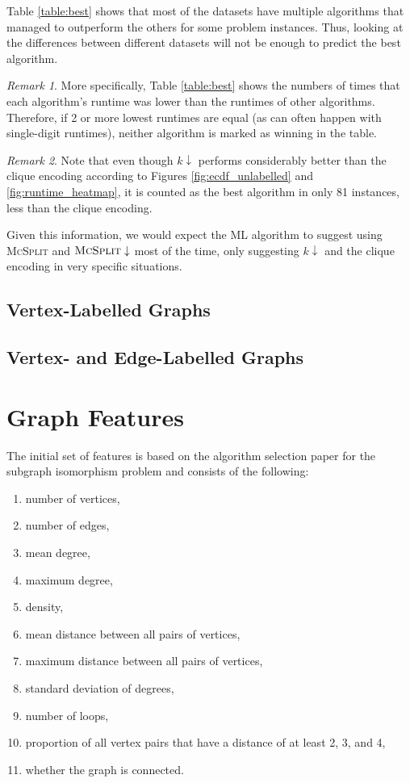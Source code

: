 \documentclass{l4proj}
\theoremstyle{definition}
\theoremstyle{remark}
\newtheorem{remark}{Remark}[section]
\begin{document}
Table \ref{table:best} shows that most of the datasets have multiple algorithms
that managed to outperform the others for some problem instances. Thus, looking
at the differences between different datasets will not be enough to predict the
best algorithm.

\begin{remark}
  More specifically, Table \ref{table:best} shows the numbers of times that each
  algorithm's runtime was lower than the runtimes of other algorithms.
  Therefore, if 2 or more lowest runtimes are equal (as can often happen with
  single-digit runtimes), neither algorithm is marked as winning in the table.
\end{remark}

\begin{remark}
Note that even though $k\downarrow$ performs considerably better than the clique
encoding according to Figures \ref{fig:ecdf_unlabelled} and
\ref{fig:runtime_heatmap}, it is counted as the best algorithm in only 81
instances, less than the clique encoding.
\end{remark}

Given this information, we would expect the ML algorithm to suggest using
\textsc{McSplit} and $\textsc{McSplit}\downarrow$ most of the time, only
suggesting $k\downarrow$ and the clique encoding in very specific situations.

\subsection{Vertex-Labelled Graphs}
\subsection{Vertex- and Edge-Labelled Graphs}

\section{Graph Features} \label{sec:features}
The initial set of features is based on the algorithm selection paper for the
subgraph isomorphism problem \cite{DBLP:conf/lion/KotthoffMS16} and consists of
the following:

\begin{enumerate}
\item number of vertices,
\item number of edges,
\item mean degree,
\item maximum degree,
\item density,
\item mean distance between all pairs of vertices,
\item maximum distance between all pairs of vertices,
\item standard deviation of degrees,
\item number of loops,
\item proportion of all vertex pairs that have a distance of at least 2, 3, and 4,
\item whether the graph is connected.
\end{enumerate}
\end{document}
